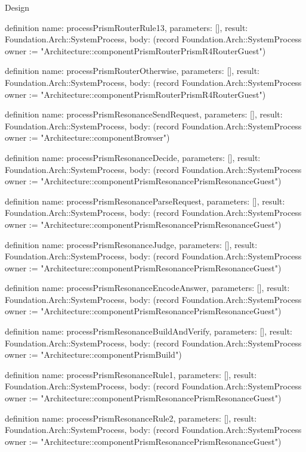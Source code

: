 \begin{lexlean}{Design}
\begin{semanticmodule}
definition{
  name: processPrismRouterRule13,
  parameters: [],
  result: Foundation.Arch::SystemProcess,
  body: (record Foundation.Arch::SystemProcess {owner := "Architecture::componentPrismRouterPrismR4RouterGuest"})
}

definition{
  name: processPrismRouterOtherwise,
  parameters: [],
  result: Foundation.Arch::SystemProcess,
  body: (record Foundation.Arch::SystemProcess {owner := "Architecture::componentPrismRouterPrismR4RouterGuest"})
}

definition{
  name: processPrismResonanceSendRequest,
  parameters: [],
  result: Foundation.Arch::SystemProcess,
  body: (record Foundation.Arch::SystemProcess {owner := "Architecture::componentBrowser"})
}

definition{
  name: processPrismResonanceDecide,
  parameters: [],
  result: Foundation.Arch::SystemProcess,
  body: (record Foundation.Arch::SystemProcess {owner := "Architecture::componentPrismResonancePrismResonanceGuest"})
}

definition{
  name: processPrismResonanceParseRequest,
  parameters: [],
  result: Foundation.Arch::SystemProcess,
  body: (record Foundation.Arch::SystemProcess {owner := "Architecture::componentPrismResonancePrismResonanceGuest"})
}

definition{
  name: processPrismResonanceJudge,
  parameters: [],
  result: Foundation.Arch::SystemProcess,
  body: (record Foundation.Arch::SystemProcess {owner := "Architecture::componentPrismResonancePrismResonanceGuest"})
}

definition{
  name: processPrismResonanceEncodeAnswer,
  parameters: [],
  result: Foundation.Arch::SystemProcess,
  body: (record Foundation.Arch::SystemProcess {owner := "Architecture::componentPrismResonancePrismResonanceGuest"})
}

definition{
  name: processPrismResonanceBuildAndVerify,
  parameters: [],
  result: Foundation.Arch::SystemProcess,
  body: (record Foundation.Arch::SystemProcess {owner := "Architecture::componentPrismBuild"})
}

definition{
  name: processPrismResonanceRule1,
  parameters: [],
  result: Foundation.Arch::SystemProcess,
  body: (record Foundation.Arch::SystemProcess {owner := "Architecture::componentPrismResonancePrismResonanceGuest"})
}

definition{
  name: processPrismResonanceRule2,
  parameters: [],
  result: Foundation.Arch::SystemProcess,
  body: (record Foundation.Arch::SystemProcess {owner := "Architecture::componentPrismResonancePrismResonanceGuest"})
}


\end{semanticmodule}
\end{lexlean}

